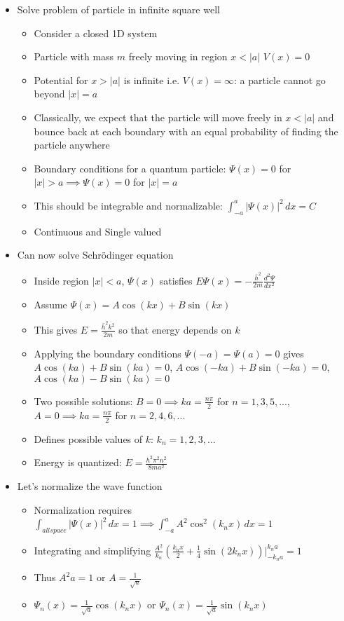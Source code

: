 \documentclass[12pt]{article}
\begin{document}
\begin{itemize}
    \item Solve problem of particle in infinite square well \begin{itemize}
        \item Consider a closed 1D system
        \item Particle with mass $m$ freely moving in region $x < |a|$ $V(x) = 0$
        \item Potential for $x > |a|$ is infinite i.e. $V(x) = \infty$: a particle cannot go beyond $|x| = a$
        \item Classically, we expect that the particle will move freely in $x < |a|$ and bounce back at each boundary with an equal probability of finding the particle anywhere
        \item Boundary conditions for a quantum particle: $\varPsi(x) = 0$ for $|x| > a \implies \varPsi(x) = 0$ for $|x| = a$
        \item This should be integrable and normalizable: $\int_{-a}^{a} | \varPsi(x) |^2 \, dx = C$
        \item Continuous and Single valued
    \end{itemize}
    \item Can now solve Schr\"{o}dinger equation \begin{itemize}
        \item Inside region $|x| < a$, $\varPsi(x)$ satisfies $E \varPsi(x) = - \frac{\bar{h}^2}{2m} \frac{d^2 \varPsi}{dx^2}$
        \item Assume $\varPsi(x) = A \cos(kx) + B \sin(kx)$
        \item This gives $E = \frac{\bar{h}^2k^2}{2m}$ so that energy depends on $k$
        \item Applying the boundary conditions $\varPsi(-a) = \varPsi(a) = 0$ gives $A \cos(ka) + B \sin(ka) = 0$, $A \cos(-ka) + B \sin(-ka) = 0$, $A \cos(ka) - B \sin(ka) = 0$
        \item Two possible solutions: $B = 0 \implies ka = \frac{n \pi}{2}$ for $n = 1, 3, 5, ...$, $A = 0 \implies ka = \frac{n \pi}{2}$ for $n = 2, 4, 6, ...$
        \item Defines possible values of $k$: $k_n = 1, 2, 3, \dots$
        \item Energy is quantized: $E = \frac{h^2 \pi^2 n^2}{8ma^2}$
    \end{itemize}
    \item Let's normalize the wave function \begin{itemize}
        \item Normalization requires $\int_{all space} | \varPsi(x) |^2 \, dx = 1 \implies \int_{-a}^{a} A^2 \cos^2 (k_n x) \, dx = 1$ 
        \item Integrating and simplifying $\frac{A^2}{k_n} (\frac{k_nx}{2} + \frac{1}{4} \sin (2 k_n x)) |_{-k_n a}^{k_n a} = 1$
        \item Thus $A^2 a = 1$ or $A = \frac{1}{\sqrt{a}}$
        \item $\varPsi_n(x) = \frac{1}{\sqrt{a}} \cos(k_n x)$ or $\varPsi_n(x) = \frac{1}{\sqrt{a}} \sin(k_n x)$ 
    \end{itemize}
\end{itemize}
\end{document}
